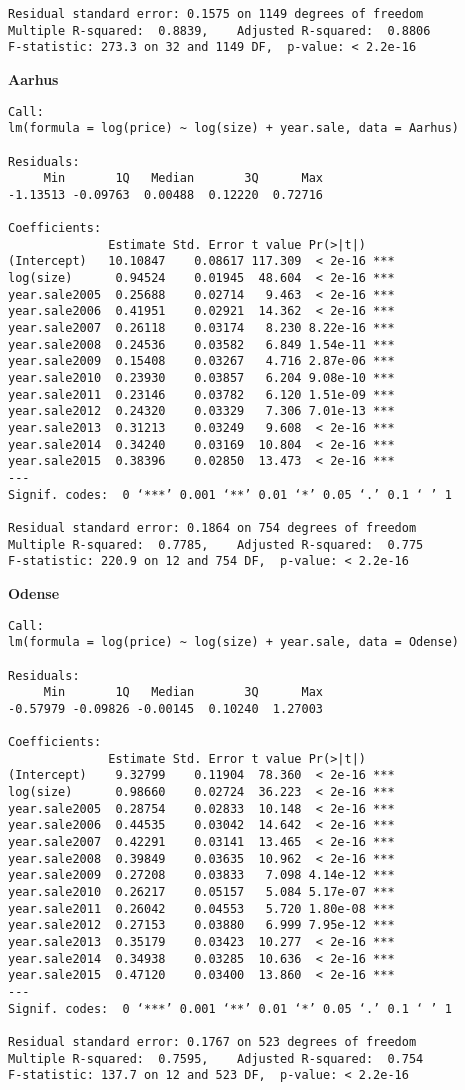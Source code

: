 \begin{lstlisting}
Residual standard error: 0.1575 on 1149 degrees of freedom
Multiple R-squared:  0.8839,	Adjusted R-squared:  0.8806 
F-statistic: 273.3 on 32 and 1149 DF,  p-value: < 2.2e-16
\end{lstlisting}

\textbf{Aarhus}
\begin{lstlisting}
Call:
lm(formula = log(price) ~ log(size) + year.sale, data = Aarhus)

Residuals:
     Min       1Q   Median       3Q      Max 
-1.13513 -0.09763  0.00488  0.12220  0.72716 

Coefficients:
              Estimate Std. Error t value Pr(>|t|)    
(Intercept)   10.10847    0.08617 117.309  < 2e-16 ***
log(size)      0.94524    0.01945  48.604  < 2e-16 ***
year.sale2005  0.25688    0.02714   9.463  < 2e-16 ***
year.sale2006  0.41951    0.02921  14.362  < 2e-16 ***
year.sale2007  0.26118    0.03174   8.230 8.22e-16 ***
year.sale2008  0.24536    0.03582   6.849 1.54e-11 ***
year.sale2009  0.15408    0.03267   4.716 2.87e-06 ***
year.sale2010  0.23930    0.03857   6.204 9.08e-10 ***
year.sale2011  0.23146    0.03782   6.120 1.51e-09 ***
year.sale2012  0.24320    0.03329   7.306 7.01e-13 ***
year.sale2013  0.31213    0.03249   9.608  < 2e-16 ***
year.sale2014  0.34240    0.03169  10.804  < 2e-16 ***
year.sale2015  0.38396    0.02850  13.473  < 2e-16 ***
---
Signif. codes:  0 ‘***’ 0.001 ‘**’ 0.01 ‘*’ 0.05 ‘.’ 0.1 ‘ ’ 1

Residual standard error: 0.1864 on 754 degrees of freedom
Multiple R-squared:  0.7785,	Adjusted R-squared:  0.775 
F-statistic: 220.9 on 12 and 754 DF,  p-value: < 2.2e-16
\end{lstlisting}

\textbf{Odense}
\begin{lstlisting}
Call:
lm(formula = log(price) ~ log(size) + year.sale, data = Odense)

Residuals:
     Min       1Q   Median       3Q      Max 
-0.57979 -0.09826 -0.00145  0.10240  1.27003 

Coefficients:
              Estimate Std. Error t value Pr(>|t|)    
(Intercept)    9.32799    0.11904  78.360  < 2e-16 ***
log(size)      0.98660    0.02724  36.223  < 2e-16 ***
year.sale2005  0.28754    0.02833  10.148  < 2e-16 ***
year.sale2006  0.44535    0.03042  14.642  < 2e-16 ***
year.sale2007  0.42291    0.03141  13.465  < 2e-16 ***
year.sale2008  0.39849    0.03635  10.962  < 2e-16 ***
year.sale2009  0.27208    0.03833   7.098 4.14e-12 ***
year.sale2010  0.26217    0.05157   5.084 5.17e-07 ***
year.sale2011  0.26042    0.04553   5.720 1.80e-08 ***
year.sale2012  0.27153    0.03880   6.999 7.95e-12 ***
year.sale2013  0.35179    0.03423  10.277  < 2e-16 ***
year.sale2014  0.34938    0.03285  10.636  < 2e-16 ***
year.sale2015  0.47120    0.03400  13.860  < 2e-16 ***
---
Signif. codes:  0 ‘***’ 0.001 ‘**’ 0.01 ‘*’ 0.05 ‘.’ 0.1 ‘ ’ 1

Residual standard error: 0.1767 on 523 degrees of freedom
Multiple R-squared:  0.7595,	Adjusted R-squared:  0.754 
F-statistic: 137.7 on 12 and 523 DF,  p-value: < 2.2e-16
\end{lstlisting}

